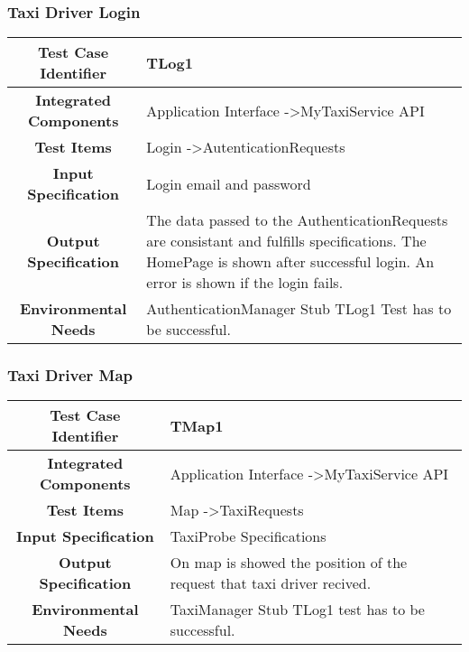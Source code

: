 \documentclass[11pt, a4paper,titlepage]{article}
\begin{document}
	\subsubsection{Taxi Driver Login}
	\begin{tabularx}{\textwidth}{| c|X|}
		\hline \textbf{Test Case Identifier} & TLog1 \\
		\hline \textbf{Integrated Components} & Application Interface -\textgreater MyTaxiService API \\
		\hline \textbf{Test Items} & Login -\textgreater AutenticationRequests \\
		\hline \textbf{Input Specification} & Login email and password \\
		\hline \textbf{Output Specification} & 
		The data passed to the AuthenticationRequests are consistant and fulfills specifications.\newline
		The HomePage is shown after successful login.\newline
		An error is shown if the login fails.  \\
		\hline \textbf{Environmental Needs} & AuthenticationManager Stub \newline TLog1 Test has to be successful. \\
		\hline
	\end{tabularx}
	\newline
	\newline
	\subsubsection{Taxi Driver Map}
	\begin{tabularx}{\textwidth}{| c|X|}
		\hline \textbf{Test Case Identifier} & TMap1 \\
		\hline \textbf{Integrated Components} & Application Interface -\textgreater MyTaxiService API \\
		\hline \textbf{Test Items} & Map -\textgreater TaxiRequests \\
		\hline \textbf{Input Specification} & TaxiProbe Specifications \\
		\hline \textbf{Output Specification} & On map is showed the position of the request that taxi driver recived. \\
		\hline \textbf{Environmental Needs} & TaxiManager Stub \newline TLog1 test has to be successful. \\
		\hline
	\end{tabularx}
	\newline
	\newline
\end{document}
